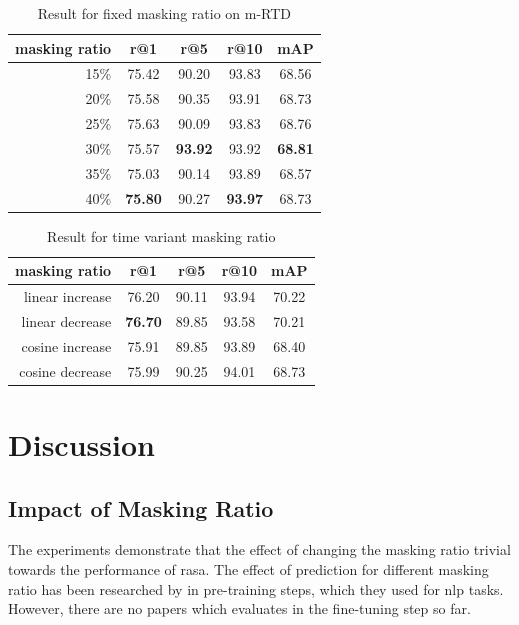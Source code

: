 \begin{table}[htbp]
  \centering
  \caption{Result for fixed masking ratio on m-RTD}
  \label{tb:mrtd_fixed}
  \begin{tabular}{rcccc}
    masking ratio & r@1 & r@5 & r@10 & mAP \\ \hline
    15\% & 75.42 & 90.20 & 93.83 & 68.56 \\
    20\% & 75.58 & 90.35 & 93.91 & 68.73 \\
    25\% & 75.63 & 90.09 & 93.83 & 68.76 \\
    30\% & 75.57 & \textbf{93.92} & 93.92 & \textbf{68.81} \\
    35\% & 75.03 & 90.14 & 93.89 & 68.57 \\
    40\% & \textbf{75.80} & 90.27 & \textbf{93.97} & 68.73
  \end{tabular}
\end{table}

\begin{table}[htbp]
  \centering
  \caption{Result for time variant masking ratio}
  \label{tb:mrtd_time_variant}
  \begin{tabular}{rcccc}
    \centering
    masking ratio & r@1 & r@5 & r@10 & mAP\\ \hline
    linear increase & 76.20 & 90.11 & 93.94 & 70.22 \\
    linear decrease & \textbf{76.70} & 89.85 & 93.58 & 70.21 \\
    cosine increase & 75.91 & 89.85 & 93.89 & 68.40 \\
    cosine decrease & 75.99 & 90.25 & 94.01 & 68.73 \\
  \end{tabular}
\end{table}


\section{Discussion}
\subsection{Impact of Masking Ratio}

The experiments demonstrate that the effect of changing the masking ratio trivial towards the performance of \acrshort{rasa}. 
The effect of prediction for different masking ratio has been researched by \cite{yang2023learningbettermaskingbetter} in pre-training steps, which they used for \acrshort{nlp} tasks. However, there are no papers which evaluates in the fine-tuning step so far.


